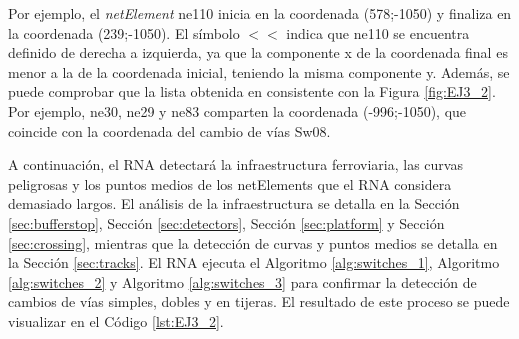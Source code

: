 	Por ejemplo, el \textit{netElement} ne110 inicia en la coordenada (578;-1050) y finaliza en la coordenada (239;-1050). El símbolo $<<$ indica que ne110 se encuentra definido de derecha a izquierda, ya que la componente x de la coordenada final es menor a la de la coordenada inicial, teniendo la misma componente y. Además, se puede comprobar que la lista obtenida en consistente con la Figura \ref{fig:EJ3_2}. Por ejemplo, ne30, ne29 y ne83 comparten la coordenada (-996;-1050), que coincide con la coordenada del cambio de vías Sw08.
	
	A continuación, el RNA detectará la infraestructura ferroviaria, las curvas peligrosas y los puntos medios de los netElements que el RNA considera demasiado largos. El análisis de la infraestructura se detalla en la Sección \ref{sec:bufferstop}, Sección \ref{sec:detectors}, Sección \ref{sec:platform} y Sección \ref{sec:crossing}, mientras que la detección de curvas y puntos medios se detalla en la Sección \ref{sec:tracks}. El RNA ejecuta el Algoritmo \ref{alg:switches_1}, Algoritmo \ref{alg:switches_2} y Algoritmo \ref{alg:switches_3} para confirmar la detección de cambios de vías simples, dobles y en tijeras. El resultado de este proceso se puede visualizar en el Código \ref{lst:EJ3_2}.
	
